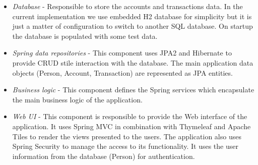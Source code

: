 \documentclass[a4paper, notitlepage]{article}
\begin{document}
\bigskip
\begin{itemize}
	\item \textit{Database} - Responsible to store the accounts and transactions data. In the current implementation we use embedded H2 database for simplicity but it is just a matter of configuration to switch to another SQL database. On startup the database is populated with some test data.
	
	\item \textit{Spring data repositories} - This component uses JPA2 and Hibernate to provide CRUD stile interaction with the database. The main application data objects (Person, Account, Transaction) are represented as JPA entities. 
	
	\item \textit{Business logic} - This component defines the Spring services which encapsulate the main business logic of the application.
	
	\item \textit{Web UI} - This component is responsible to provide the Web interface of the application. It uses Spring MVC in combination with Thymeleaf and Apache Tiles to render the views presented to the users. The application also uses Spring Security to manage the access to its functionality. It uses the user information from the database (Person) for authentication.
\end{itemize}
\end{document}
